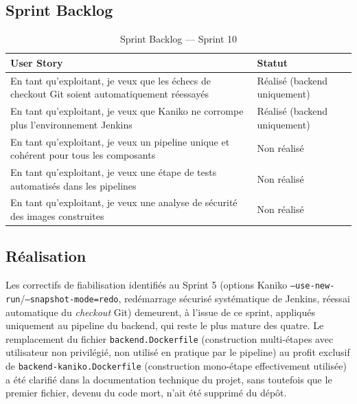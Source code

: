 \subsection{Sprint Backlog}

\begin{table}[!ht]
\begin{center}
     \begin{tabular}{|l{11cm}|l{3cm}|}
     \hline
     \textbf{User Story} & \textbf{Statut} \\
     \hline
     En tant qu'exploitant, je veux que les échecs de checkout Git soient automatiquement réessayés & Réalisé (backend uniquement) \\
     \hline
     En tant qu'exploitant, je veux que Kaniko ne corrompe plus l'environnement Jenkins & Réalisé (backend uniquement) \\
     \hline
     En tant qu'exploitant, je veux un pipeline unique et cohérent pour tous les composants & Non réalisé \\
     \hline
     En tant qu'exploitant, je veux une étape de tests automatisés dans les pipelines & Non réalisé \\
     \hline
     En tant qu'exploitant, je veux une analyse de sécurité des images construites & Non réalisé \\
     \hline
     \end{tabular}
     \caption{Sprint Backlog — Sprint 10}
     \label{tab:sb-sprint10}
     \end{center}
\end{table}

\subsection{Réalisation}

Les correctifs de fiabilisation identifiés au Sprint 5 (options Kaniko \texttt{--use-new-run}/\texttt{--snapshot-mode=redo}, redémarrage sécurisé systématique de Jenkins, réessai automatique du \textit{checkout} Git) demeurent, à l'issue de ce sprint, appliqués uniquement au pipeline du backend, qui reste le plus mature des quatre. Le remplacement du fichier \texttt{backend.Dockerfile} (construction multi-étapes avec utilisateur non privilégié, non utilisé en pratique par le pipeline) au profit exclusif de \texttt{backend-kaniko.Dockerfile} (construction mono-étape effectivement utilisée) a été clarifié dans la documentation technique du projet, sans toutefois que le premier fichier, devenu du code mort, n'ait été supprimé du dépôt.

